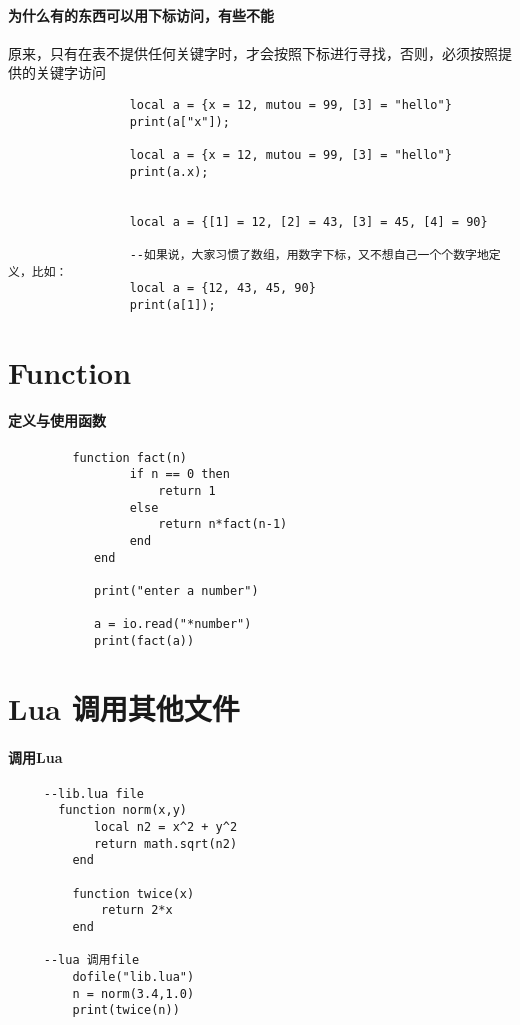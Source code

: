 \documentclass[UTF8,a4paper,8pt]{ctexart}
\begin{document}
	\paragraph{为什么有的东西可以用下标访问，有些不能}
			原来，只有在表不提供任何关键字时，才会按照下标进行寻找，否则，必须按照提供的关键字访问
			 \begin{lstlisting}
				 local a = {x = 12, mutou = 99, [3] = "hello"}
				 print(a["x"]);
				 
				 local a = {x = 12, mutou = 99, [3] = "hello"}
				 print(a.x);
				 
				 
				 local a = {[1] = 12, [2] = 43, [3] = 45, [4] = 90}
				 
				 --如果说，大家习惯了数组，用数字下标，又不想自己一个个数字地定义，比如：
				 local a = {12, 43, 45, 90}
				 print(a[1]);
			  \end{lstlisting}
\newpage
\section{Function}
	\paragraph{定义与使用函数}
		 \begin{lstlisting}
	 	 function fact(n)
				 if n == 0 then
					 return 1
				 else
					 return n*fact(n-1)
				 end
			end
			
			print("enter a number")
			
			a = io.read("*number")
			print(fact(a))
		 \end{lstlisting}
\newpage
\section{Lua 调用其他文件}
	\paragraph{调用Lua}
	 \begin{lstlisting}
	 --lib.lua file
	   function norm(x,y)
		    local n2 = x^2 + y^2
		    return math.sqrt(n2)
		 end
		 
		 function twice(x)
			 return 2*x
		 end
	    
	 --lua 调用file
		 dofile("lib.lua")
		 n = norm(3.4,1.0)
		 print(twice(n))
		 
	 \end{lstlisting}
\end{document}

